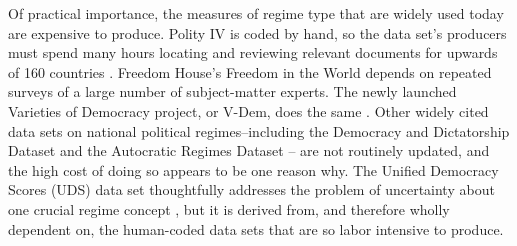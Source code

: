 \documentclass[pdftex,12pt,fullpage,oneside]{amsart}
\begin{document}


Of practical importance, the measures of regime type that are widely used today are expensive to produce. Polity IV is coded by hand, so the data set's producers must spend many hours locating and reviewing relevant documents for upwards of 160 countries \citep{marshall:jaggers:2002}. Freedom House's Freedom in the World depends on repeated surveys of a large number of subject-matter experts. The newly launched Varieties of Democracy project, or V-Dem, does the same \citep{coppedge:etal:2013}. Other widely cited data sets on national political regimes--including the Democracy and Dictatorship Dataset \citep{cheibub:etal:2010} and the Autocratic Regimes Dataset \citep{geddes:etal:2014} -- are not routinely updated, and the high cost of doing so appears to be one reason why. The Unified Democracy Scores (UDS) data set thoughtfully addresses the problem of uncertainty about one crucial regime concept \citep{pemstein:etal:2010}, but it is derived from, and therefore wholly dependent on, the human-coded data sets that are so labor intensive to produce.
\end{document}
